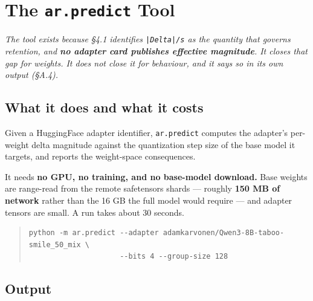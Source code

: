 \appendix

\section{The \texttt{ar.predict} Tool}



\emph{The tool exists because \S{}4.1 identifies \texttt{|Delta|/\allowbreak{}s} as the quantity that governs retention, and \textbf{no adapter card publishes effective magnitude}. It closes that gap for weights. It does not close it for behaviour, and it says so in its own output (\S{}A.4).}


\subsection{What it does and what it costs}

Given a HuggingFace adapter identifier, \texttt{ar.\allowbreak{}predict} computes the adapter's per-weight delta magnitude against the quantization step size of the base model it targets, and reports the weight-space consequences.

It needs \textbf{no GPU, no training, and no base-model download.} Base weights are range-read from the remote safetensors shards --- roughly \textbf{150 MB of network} rather than the 16 GB the full model would require --- and adapter tensors are small. A run takes about 30 seconds.

\begin{quote}\tiny\begin{verbatim}
python -m ar.predict --adapter adamkarvonen/Qwen3-8B-taboo-smile_50_mix \
                     --bits 4 --group-size 128
\end{verbatim}\end{quote}

\subsection{Output}

